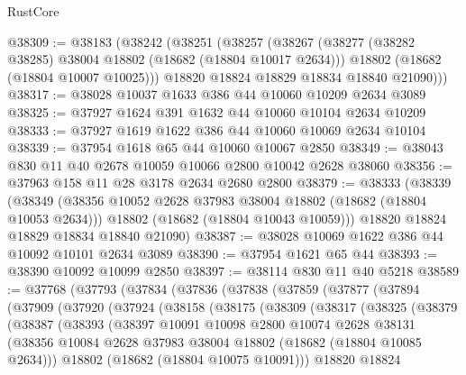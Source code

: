 \begin{lexlean}{RustCore}
\begin{coremodule}
@38309 := @38183
    (@38242
      (@38251
        (@38257
          (@38267
            (@38277 (@38282 @38285) @38004 @18802 (@18682 (@18804 @10017 @2634)))
            @18802
            (@18682 (@18804 @10007 @10025)))
          @18820
          @18824
          @18829
          @18834
          @18840
          @21090)))
@38317 := @38028 @10037 @1633 @386 @44 @10060 @10209 @2634 @3089
@38325 := @37927 @1624 @391 @1632 @44 @10060 @10104 @2634 @10209
@38333 := @37927 @1619 @1622 @386 @44 @10060 @10069 @2634 @10104
@38339 := @37954 @1618 @65 @44 @10060 @10067 @2850
@38349 := @38043 @830 @11 @40 @2678 @10059 @10066 @2800 @10042 @2628 @38060
@38356 := @37963 @158 @11 @28 @3178 @2634 @2680 @2800
@38379 := @38333
    (@38339
      (@38349
        (@38356 @10052 @2628 @37983 @38004 @18802 (@18682 (@18804 @10053 @2634)))
        @18802
        (@18682 (@18804 @10043 @10059)))
      @18820
      @18824
      @18829
      @18834
      @18840
      @21090)
@38387 := @38028 @10069 @1622 @386 @44 @10092 @10101 @2634 @3089
@38390 := @37954 @1621 @65 @44
@38393 := @38390 @10092 @10099 @2850
@38397 := @38114 @830 @11 @40 @5218
@38589 := @37768
    (@37793
      (@37834
        (@37836
          (@37838
            (@37859
              (@37877
                (@37894
                  (@37909
                    (@37920
                      (@37924
                        (@38158
                          (@38175
                            (@38309
                              (@38317
                                (@38325
                                  (@38379
                                    (@38387
                                      (@38393
                                        (@38397
                                          @10091
                                          @10098
                                          @2800
                                          @10074
                                          @2628
                                          @38131
                                          (@38356
                                            @10084
                                            @2628
                                            @37983
                                            @38004
                                            @18802
                                            (@18682 (@18804 @10085 @2634)))
                                          @18802
                                          (@18682 (@18804 @10075 @10091)))
                                        @18820
                                        @18824

\end{coremodule}
\end{lexlean}
